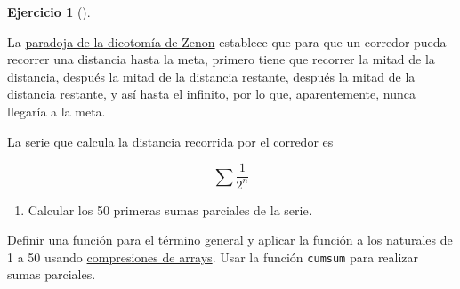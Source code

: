 \documentclass[
  a4paper,
]{scrreport}
\providecommand{\tightlist}{%
  \setlength{\itemsep}{0pt}\setlength{\parskip}{0pt}}\usepackage{longtable,booktabs,array}
\theoremstyle{definition}
\newtheorem{exercise}{Ejercicio}[chapter]
\theoremstyle{remark}
\begin{document}
\leavevmode{}%
\begin{exercise}[]\label{exr-paradoja-dicotomia-zenon}

La
\href{https://es.wikipedia.org/wiki/Paradojas_de_Zen\%C3\%B3n\#Paradoja_de_la_dicotom\%C3\%ADa}{paradoja
de la dicotomía de Zenon} establece que para que un corredor pueda
recorrer una distancia hasta la meta, primero tiene que recorrer la
mitad de la distancia, después la mitad de la distancia restante,
después la mitad de la distancia restante, y así hasta el infinito, por
lo que, aparentemente, nunca llegaría a la meta.

La serie que calcula la distancia recorrida por el corredor es

\[
\sum \frac{1}{2^n}
\]

\begin{enumerate}
\def\labelenumi{\alph{enumi}.}
\tightlist
\item
  Calcular los 50 primeras sumas parciales de la serie.
\end{enumerate}

\begin{tcolorbox}[enhanced jigsaw, toptitle=1mm, colframe=quarto-callout-note-color-frame, opacitybacktitle=0.6, colback=white, titlerule=0mm, toprule=.15mm, arc=.35mm, coltitle=black, colbacktitle=quarto-callout-note-color!10!white, bottomtitle=1mm, bottomrule=.15mm, title=\textcolor{quarto-callout-note-color}{\faInfo}\hspace{0.5em}{Ayuda}, rightrule=.15mm, opacityback=0, leftrule=.75mm, left=2mm, breakable]

Definir una función para el término general y aplicar la función a los
naturales de 1 a 50 usando
\href{https://aprendeconalf.es/manual-julia/tipos-datos-compuestos.html\#comprensi\%C3\%B3n-de-arrays}{compresiones
de arrays}. Usar la función \texttt{cumsum} para realizar sumas
parciales.

\end{tcolorbox}

\begin{tcolorbox}[enhanced jigsaw, toptitle=1mm, colframe=quarto-callout-tip-color-frame, opacitybacktitle=0.6, colback=white, titlerule=0mm, toprule=.15mm, arc=.35mm, coltitle=black, colbacktitle=quarto-callout-tip-color!10!white, bottomtitle=1mm, bottomrule=.15mm, title=\textcolor{quarto-callout-tip-color}{\faLightbulb}\hspace{0.5em}{Solución 1}, rightrule=.15mm, opacityback=0, leftrule=.75mm, left=2mm, breakable]


\end{tcolorbox}
\end{exercise}
\end{document}
